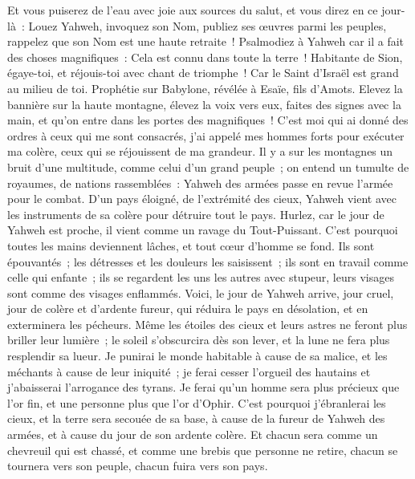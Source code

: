 \begin{multicols}{2}
Et vous puiserez de l'eau avec joie aux sources du salut,
et vous direz en ce jour-là~: Louez Yahweh, invoquez son Nom, publiez ses œuvres parmi les peuples, rappelez que son Nom est une haute retraite~!
Psalmodiez à Yahweh car il a fait des choses magnifiques~: Cela est connu dans toute la terre~!
Habitante de Sion, égaye-toi, et réjouis-toi avec chant de triomphe~! Car le Saint d'Israël est grand au milieu de toi.
\VerseOne{}Prophétie sur Babylone, révélée à Esaïe, fils d'Amots.
Elevez la bannière sur la haute montagne, élevez la voix vers eux, faites des signes avec la main, et qu'on entre dans les portes des magnifiques~!
C'est moi qui ai donné des ordres à ceux qui me sont consacrés, j'ai appelé mes hommes forts pour exécuter ma colère, ceux qui se réjouissent de ma grandeur.
Il y a sur les montagnes un bruit d'une multitude, comme celui d'un grand peuple~; on entend un tumulte de royaumes, de nations rassemblées~: Yahweh des armées passe en revue l'armée pour le combat.
D'un pays éloigné, de l'extrémité des cieux, Yahweh vient avec les instruments de sa colère pour détruire tout le pays.
Hurlez, car le jour de Yahweh est proche, il vient comme un ravage du Tout-Puissant.
C'est pourquoi toutes les mains deviennent lâches, et tout cœur d'homme se fond.
Ils sont épouvantés~; les détresses et les douleurs les saisissent~; ils sont en travail comme celle qui enfante~; ils se regardent les uns les autres avec stupeur, leurs visages sont comme des visages enflammés.
Voici, le jour de Yahweh arrive, jour cruel, jour de colère et d'ardente fureur, qui réduira le pays en désolation, et en exterminera les pécheurs.
Même les étoiles des cieux et leurs astres ne feront plus briller leur lumière~; le soleil s'obscurcira dès son lever, et la lune ne fera plus resplendir sa lueur.
Je punirai le monde habitable à cause de sa malice, et les méchants à cause de leur iniquité~; je ferai cesser l'orgueil des hautains et j'abaisserai l'arrogance des tyrans.
Je ferai qu'un homme sera plus précieux que l'or fin, et une personne plus que l'or d'Ophir.
C'est pourquoi j'ébranlerai les cieux, et la terre sera secouée de sa base, à cause de la fureur de Yahweh des armées, et à cause du jour de son ardente colère.
Et chacun sera comme un chevreuil qui est chassé, et comme une brebis que personne ne retire, chacun se tournera vers son peuple, chacun fuira vers son pays.

\end{multicols}
